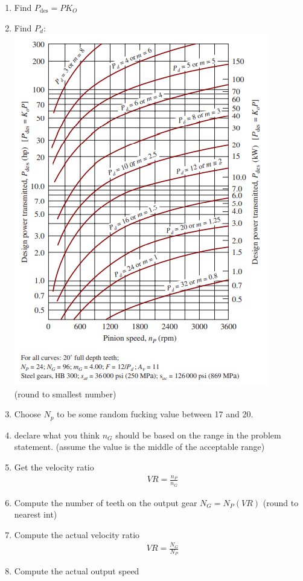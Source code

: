 \documentclass[11pt, fleqn]{article}
\begin{document}
\begin{enumerate}
    \item Find $P_\text{des}=PK_O$
    \item Find $P_d$:\\
    \includegraphics[scale=1]{Gears/Fig 9-11.png}\\
    (round to smallest number)
    \item Choose $N_p$ to be some random fucking value between 17 and 20.
    \item declare what you think $n_G$ should be based on the range in the problem statement. (assume the value is the middle of the acceptable range)
    \item Get the velocity ratio
    \begin{align*}
        &VR=\frac{n_P}{n_G}
    \end{align*}
    \item Compute the number of teeth on the output gear $N_G=N_P(VR)$ (round to nearest int)
    \item Compute the actual velocity ratio
    \begin{align*}
        &VR=\frac{N_G}{N_P}
    \end{align*}
    \item Compute the actual output speed

\end{enumerate}
\end{document}
